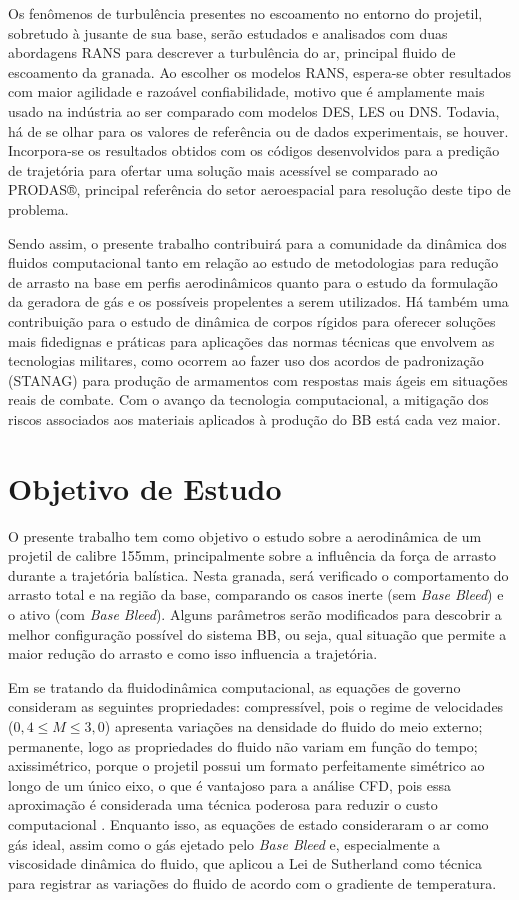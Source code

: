 Os fenômenos de turbulência presentes no escoamento no entorno do projetil, sobretudo à jusante de sua base, serão estudados e analisados com duas abordagens RANS para descrever a turbulência do ar, principal fluido de escoamento da granada. Ao escolher os modelos RANS, espera-se obter resultados com maior agilidade e razoável confiabilidade, motivo que é amplamente mais usado na indústria ao ser comparado com modelos DES, LES ou DNS. Todavia, há de se olhar para os valores de referência ou de dados experimentais, se houver. Incorpora-se os resultados obtidos com os códigos desenvolvidos para a predição de trajetória para ofertar uma solução mais acessível se comparado ao PRODAS®, principal referência do setor aeroespacial para resolução deste tipo de problema.

Sendo assim, o presente trabalho contribuirá para a comunidade da dinâmica dos fluidos computacional tanto em relação ao estudo de metodologias para redução de arrasto na base em perfis aerodinâmicos quanto para o estudo da formulação da geradora de gás e os possíveis propelentes a serem utilizados. Há também uma contribuição para o estudo de dinâmica de corpos rígidos para oferecer soluções mais fidedignas e práticas para aplicações das normas técnicas que envolvem as tecnologias militares, como ocorrem ao fazer uso dos acordos de padronização (STANAG) para produção de armamentos com respostas mais ágeis em situações reais de combate. Com o avanço da tecnologia computacional, a mitigação dos riscos associados aos materiais aplicados à produção do BB está cada vez maior. 

\section{Objetivo de Estudo}

O presente trabalho tem como objetivo o estudo sobre a aerodinâmica de um projetil de calibre 155mm, principalmente sobre a influência da força de arrasto durante a trajetória balística. Nesta granada, será verificado o comportamento do arrasto total e na região da base, comparando os casos inerte (sem \textit{Base Bleed}) e o ativo (com \textit{Base Bleed}). Alguns parâmetros serão modificados para descobrir a melhor configuração possível do sistema BB, ou seja, qual situação que permite a maior redução do arrasto e como isso influencia a trajetória.
	
Em se tratando da fluidodinâmica computacional, as equações de governo consideram as seguintes propriedades: compressível, pois o regime de velocidades ($0,4 \leq M \leq 3,0$) apresenta variações na densidade do fluido do meio externo; permanente, logo as propriedades do fluido não variam em função do tempo; axissimétrico, porque o projetil possui um formato perfeitamente simétrico ao longo de um único eixo, o que é vantajoso para a análise CFD, pois essa aproximação é considerada uma técnica poderosa para reduzir o custo computacional \cite{Lucena2020}. Enquanto isso, as equações de estado consideraram o ar como gás ideal, assim como o gás ejetado pelo \textit{Base Bleed} e, especialmente a viscosidade dinâmica do fluido, que aplicou a Lei de Sutherland como técnica para registrar as variações do fluido de acordo com o gradiente de temperatura.

